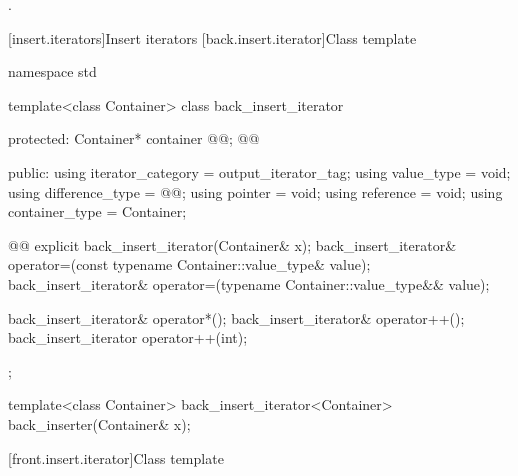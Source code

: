 \begin{itemdescr}
\pnum
\returns
{}.
\end{itemdescr}







[insert.iterators]{Insert iterators}
[back.insert.iterator]{Class template }


%
\begin{codeblock}
namespace std {
  template<class Container>
  class back_insert_iterator {
  protected:
    Container* container @@; @\added{// \expos}@

  public:
    using iterator_category = output_iterator_tag;
    using value_type        = void;
    using difference_type   = @@;
    using pointer           = void;
    using reference         = void;
    using container_type    = Container;

    @@
    explicit back_insert_iterator(Container& x);
    back_insert_iterator& operator=(const typename Container::value_type& value);
    back_insert_iterator& operator=(typename Container::value_type&& value);

    back_insert_iterator& operator*();
    back_insert_iterator& operator++();
    back_insert_iterator  operator++(int);
  };

  template<class Container>
    back_insert_iterator<Container> back_inserter(Container& x);
}
\end{codeblock}


[front.insert.iterator]{Class template }



